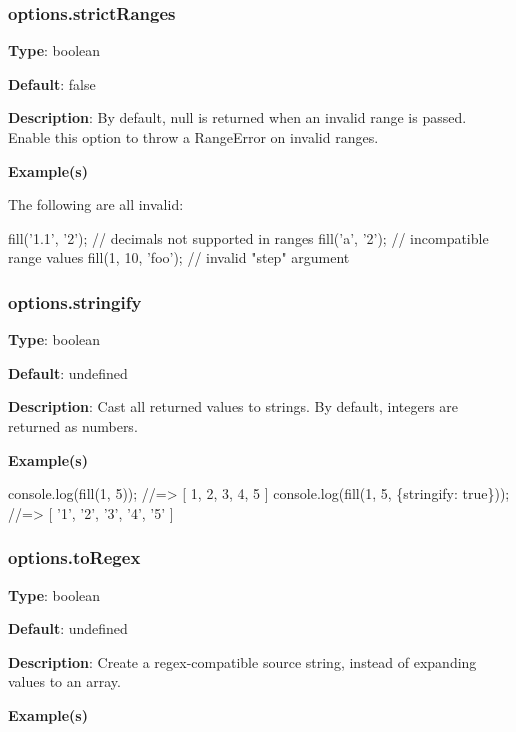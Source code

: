\subsubsection*{options.\+strict\+Ranges}

{\bfseries Type}\+: {\ttfamily boolean}

{\bfseries Default}\+: {\ttfamily false}

{\bfseries Description}\+: By default, {\ttfamily null} is returned when an invalid range is passed. Enable this option to throw a {\ttfamily Range\+Error} on invalid ranges.

{\bfseries Example(s)}

The following are all invalid\+:


\begin{DoxyCode}
fill('1.1', '2');   // decimals not supported in ranges
fill('a', '2');     // incompatible range values
fill(1, 10, 'foo'); // invalid "step" argument
\end{DoxyCode}


\subsubsection*{options.\+stringify}

{\bfseries Type}\+: {\ttfamily boolean}

{\bfseries Default}\+: {\ttfamily undefined}

{\bfseries Description}\+: Cast all returned values to strings. By default, integers are returned as numbers.

{\bfseries Example(s)}


\begin{DoxyCode}
console.log(fill(1, 5));                    //=> [ 1, 2, 3, 4, 5 ]
console.log(fill(1, 5, \{stringify: true\})); //=> [ '1', '2', '3', '4', '5' ]
\end{DoxyCode}


\subsubsection*{options.\+to\+Regex}

{\bfseries Type}\+: {\ttfamily boolean}

{\bfseries Default}\+: {\ttfamily undefined}

{\bfseries Description}\+: Create a regex-\/compatible source string, instead of expanding values to an array.

{\bfseries Example(s)}


